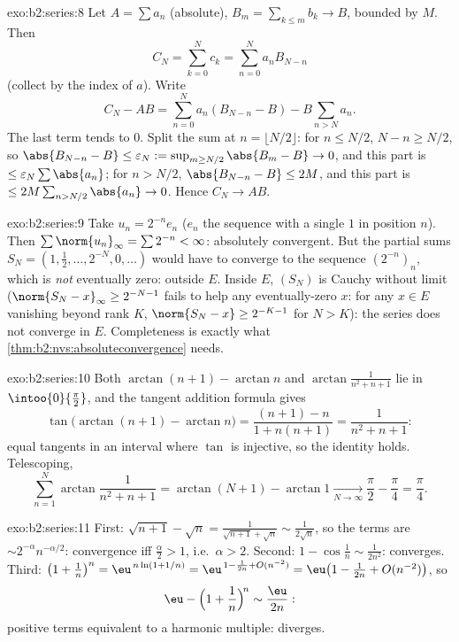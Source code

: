 \begin{solution}{exo:b2:series:8}
Let $A = \sum a_n$ (absolute), $B_m = \sum_{k\leq m} b_k \to B$,
bounded by $M$. Then
\[
C_N = \sum_{k=0}^{N} c_k = \sum_{n=0}^{N} a_n B_{N-n}
\]
(collect by the index of $a$). Write
\[
C_N - AB = \sum_{n=0}^{N} a_n (B_{N-n} - B) - B\sum_{n > N} a_n .
\]
The last term tends to $0$. Split the sum at $n = \lfloor N/2
\rfloor$: for $n \leq N/2$, $N - n \geq N/2$, so $\abs{B_{N-n} - B}
\leq \varepsilon_N := \sup_{m \geq N/2}\abs{B_m - B} \to 0$, and
this part is $\leq \varepsilon_N \sum\abs{a_n}$; for $n > N/2$,
$\abs{B_{N-n} - B} \leq 2M$, and this part is $\leq 2M \sum_{n >
N/2} \abs{a_n} \to 0$. Hence $C_N \to AB$.
\end{solution}

\begin{solution}{exo:b2:series:9}
Take $u_n = 2^{-n} e_n$ ($e_n$ the sequence with a single $1$ in
position $n$). Then $\sum \norm{u_n}_\infty = \sum 2^{-n} <
\infty$: absolutely convergent. But the partial sums $S_N =
(1, \tfrac12, \dots, 2^{-N}, 0, \dots)$ would have to converge to
the sequence $(2^{-n})_n$, which is \emph{not} eventually zero:
outside $E$. Inside $E$, $(S_N)$ is Cauchy without limit ($\norm{S_N
- x}_\infty \geq 2^{-N-1}$ fails to help any eventually-zero $x$:
for any $x \in E$ vanishing beyond rank $K$, $\norm{S_N - x} \geq
2^{-K-1}$ for $N > K$): the series does not converge in $E$.
Completeness is exactly what \cref{thm:b2:nvs:absoluteconvergence}
needs.
\end{solution}

\begin{solution}{exo:b2:series:10}
Both $\arctan(n+1) - \arctan n$ and
$\arctan\frac{1}{n^2+n+1}$ lie in $\intoo{0}{\frac\pi2}$, and the
tangent addition formula gives
\[
\tan\bigl(\arctan(n{+}1) - \arctan n\bigr)
= \frac{(n+1) - n}{1 + n(n+1)} = \frac{1}{n^2 + n + 1} :
\]
equal tangents in an interval where $\tan$ is injective, so the
identity holds. Telescoping,
\[
\sum_{n=1}^{N}\arctan\frac{1}{n^2+n+1}
= \arctan(N{+}1) - \arctan 1 \xrightarrow[N\to\infty]{}
\frac\pi2 - \frac\pi4 = \frac\pi4 .
\]

\end{solution}

\begin{solution}{exo:b2:series:11}
First: $\sqrt{n+1} - \sqrt n = \frac{1}{\sqrt{n+1} + \sqrt n}
\sim \frac{1}{2\sqrt n}$, so the terms are $\sim
2^{-\alpha}n^{-\alpha/2}$: convergence iff $\frac\alpha2 > 1$,
i.e.\ $\alpha > 2$. Second: $1 - \cos\frac1n \sim
\frac{1}{2n^2}$: converges. Third: $\bigl(1 + \frac1n\bigr)^n =
\eu^{\,n\ln(1 + 1/n)} = \eu^{\,1 - \frac1{2n} + O(n^{-2})} =
\eu\bigl(1 - \frac{1}{2n} + O(n^{-2})\bigr)$, so
\[
\eu - \Bigl(1 + \frac1n\Bigr)^{\!n} \sim \frac{\eu}{2n} :
\]
positive terms equivalent to a harmonic multiple: diverges.
\end{solution}

